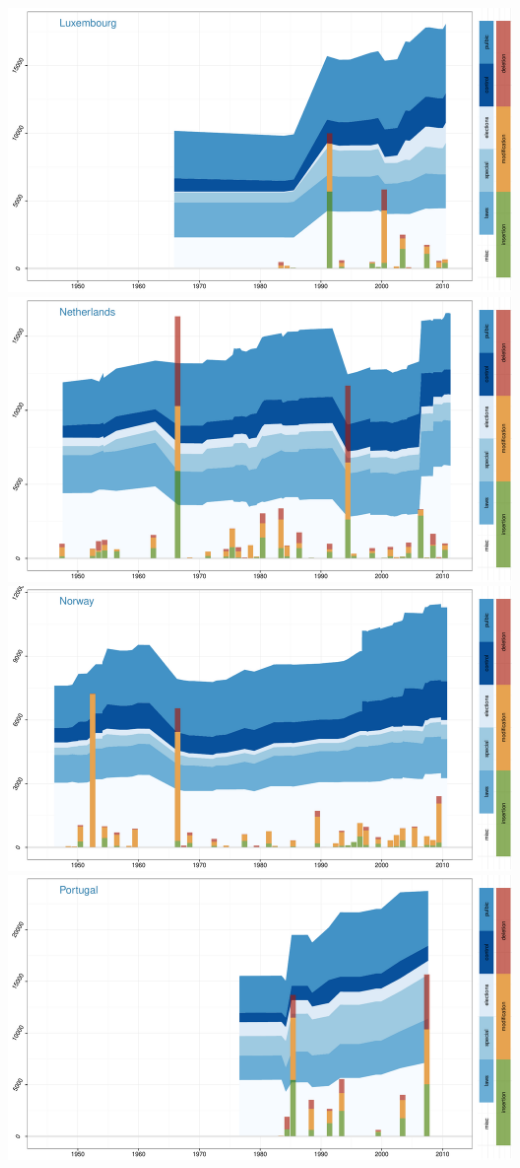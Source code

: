 \documentclass[a4paper, landscape]{article}
\begin{document}
\includegraphics{country_graphs_files/figure-latex/unnamed-chunk-3-12.pdf}
\includegraphics{country_graphs_files/figure-latex/unnamed-chunk-3-13.pdf}
\includegraphics{country_graphs_files/figure-latex/unnamed-chunk-3-14.pdf}
\includegraphics{country_graphs_files/figure-latex/unnamed-chunk-3-15.pdf}
\end{document}

